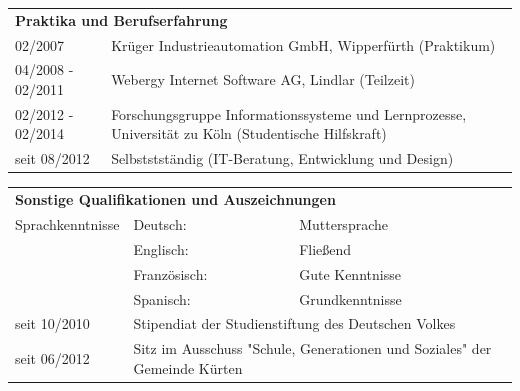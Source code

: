 \begin{flushleft}
\vspace{0.5em}

\begin{tabular}{p{11em} p{22.5em}}
    \multicolumn{2}{l}{\textbf{Praktika und Berufserfahrung}} \\
    02/2007 & Krüger Industrieautomation GmbH, Wipperfürth (Praktikum) \\
    04/2008 - 02/2011 & Webergy Internet Software AG, Lindlar (Teilzeit) \\
    02/2012 - 02/2014 & Forschungsgruppe Informationssysteme und Lernprozesse, Universität zu Köln (Studentische Hilfskraft) \\
    seit 08/2012 & Selbststständig (IT-Beratung, Entwicklung und Design) \\
\end{tabular}

\vspace{0.5em}

\begin{tabular}{p{11em} p{6em} p{16.5em}}
    \multicolumn{3}{l}{\textbf{Sonstige Qualifikationen und Auszeichnungen}} \\
    Sprachkenntnisse & Deutsch: & Muttersprache \\
    & Englisch: & Fließend \\
    & Französisch: & Gute Kenntnisse \\
    & Spanisch: & Grundkenntnisse \\
    seit 10/2010 & \multicolumn{2}{l}{Stipendiat der Studienstiftung des Deutschen Volkes} \\
    seit 06/2012 & \multicolumn{2}{p{22.5em}}{Sitz im Ausschuss "Schule, Generationen und Soziales" der Gemeinde Kürten} \\
\end{tabular}


\vspace{-1em}

\end{flushleft}